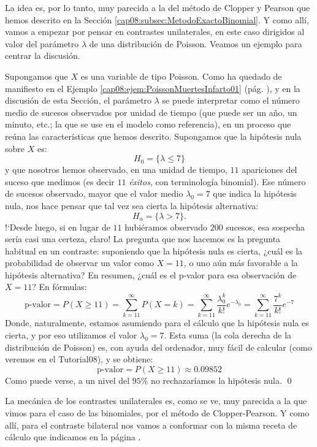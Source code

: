 La idea es, por lo tanto, muy parecida a la del método de Clopper y Pearson que hemos descrito en la Sección \ref{cap08:subsec:MetodoExactoBinomial}. Y como allí, vamos a empezar por pensar en contrastes unilaterales, en este caso dirigidos al valor del parámetro $\lambda$ de una distribución de Poisson. Veamos un ejemplo para centrar la discusión.
\begin{ejemplo}
\label{cap08:ejem:ContrasteExactoPoisson}
Supongamos que $X$ es una variable de tipo Poisson. Como ha quedado de manifiesto en el Ejemplo \ref{cap08:ejem:PoissonMuertesInfarto01} (pág. \pageref{cap08:ejem:PoissonMuertesInfarto01}), y en la discusión de esta Sección, el parámetro $\lambda$ se puede interpretar como el número medio de sucesos observados por unidad de tiempo (que puede ser un año, un minuto, etc.; la que se use en el modelo como referencia), en un proceso que reúna las características que hemos descrito. Supongamos que la hipótesis nula sobre $X$ es:
\[H_0=\{ \lambda \leq  7\}\]
y que nosotros hemos observado, en una unidad de tiempo, $11$ apariciones del suceso que medimos (es decir $11$ {\em éxitos}, con terminología binomial). Ese número de sucesos observado, mayor que el valor medio $\lambda_0=7$ que indica la hipótesis nula, nos hace pensar que tal vez sea cierta la hipótesis alternativa:
\[H_a=\{ \lambda > 7\}.\]
{!`}Desde luego, si en lugar de $11$ hubiéramos observado $200$ sucesos, esa sospecha sería casi una certeza, claro! La pregunta que nos hacemos es la pregunta habitual en un contraste: suponiendo que la hipótesis nula es cierta, ¿cuál es la probabilidad de observar un valor como $X=11$, o uno aún más favorable a la hipótesis alternativa? En resumen, ¿cuál es el p-valor para esa observación de $X=11$? En fórmulas:
\[
    \mbox{p-valor}= P(X\geq 11) =\sum_{k=11}^{\infty}P(X=k)=\sum_{k=11}^{\infty}\dfrac{\lambda_0^k}{k!}e^{-\lambda_0}
    =\sum_{k=11}^{\infty}\dfrac{7^k}{k!}e^{-7}
\]
Donde, naturalmente, estamos asumiendo para el cálculo que la hipótesis nula es cierta, y por eso utilizamos el valor $\lambda_0=7$. Esta suma (la cola derecha de la distribución de Poisson) es, con ayuda del ordenador, muy fácil de calcular (como veremos en el Tutorial08), y se obtiene:
\[
    \mbox{p-valor}= P(X\geq 11)\approx 0.09852
\]
Como puede verse, a un nivel del $95\%$ no rechazaríamos la hipótesis nula.
\qed
\end{ejemplo}
La mecánica de los contrastes unilaterales es, como se ve, muy parecida a la que vimos para el caso de las binomiales, por el método de Clopper-Pearson. Y como allí, para el contraste bilateral nos vamos a conformar con la misma receta de cálculo que indicamos en la página \pageref{cap08:ecu:HaBilateralClopperPearson}.

